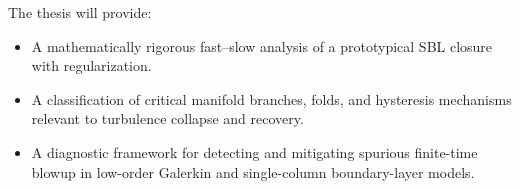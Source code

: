 \documentclass[11pt,fleqn]{article}
\begin{document}
The thesis will provide:
\begin{itemize}
    \item A mathematically rigorous fast--slow analysis of a prototypical SBL
    closure with regularization.
    \item A classification of critical manifold branches, folds, and hysteresis
    mechanisms relevant to turbulence collapse and recovery.
    \item A diagnostic framework for detecting and mitigating spurious
    finite-time blowup in low-order Galerkin and single-column boundary-layer
    models.
\end{itemize}
\end{document}
